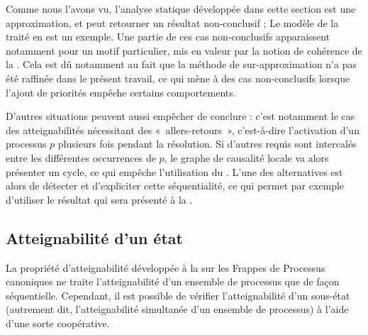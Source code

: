 Comme nous l'avons vu, l'analyse statique développée dans cette section est une approximation,
et peut retourner un résultat non-conclusif ;
Le modèle de la  traité  en est un exemple.
Une partie de ces cas non-conclusifs apparaissent notamment pour un motif particulier,
mis en valeur par la notion de cohérence de la .
Cela est dû notamment au fait que la méthode de sur-approximation n'a pas été raffinée
dans le présent travail, ce qui mène à des cas non-conclusifs lorsque l'ajout de priorités
empêche certains comportements.

D'autres situations peuvent aussi empêcher de conclure : c'est notamment le cas des
atteignabilités nécessitant des «~allers-retours~»,
c'est-à-dire l'activation d'un processus $p$ plusieurs fois pendant la résolution.
Si d'autres requis sont intercalés entre les différentes occurrences de $p$,
le graphe de causalité locale va alors présenter un cycle, ce qui empêche l'utilisation
du .
L'une des alternatives est alors de détecter et d'expliciter cette séquentialité,
ce qui permet par exemple d'utiliser le résultat qui sera présenté à la
.



\subsection{Atteignabilité d'un état}

\newcommand{\uastotal}{\tau}
\newcommand{\uasreach}{\rho}
\newcommand{\uasps}{{ps}}

La propriété d'atteignabilité développée à la 
sur les Frappes de Processus canoniques
ne traite l'atteignabilité d'un ensemble de processus que de façon séquentielle.
Cependant, il est possible de vérifier l'atteignabilité d'un sous-état
(autrement dit, l'atteignabilité simultanée d'un ensemble de processus)
à l'aide d'une sorte coopérative.

